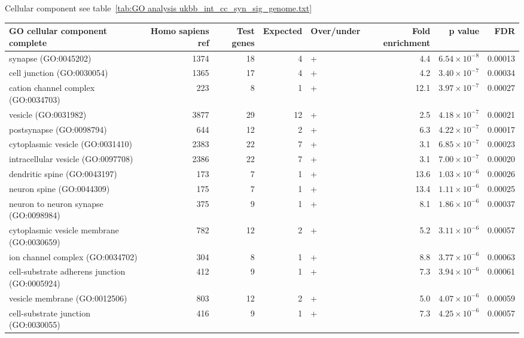 Cellular component see table~\ref{tab:GO analysis ukbb_int_cc_syn_sig_genome.txt}
\begin{table}[ht]
\centering
\begin{adjustbox}{width=\textwidth}
\begin{tabular}{lrrrlrrr}
  \hline
GO cellular component complete & Homo sapiens ref & Test genes & Expected & Over/under & Fold enrichment & p value & FDR \\ 
  \hline
synapse (GO:0045202) & 1374 & 18 & 4 & + & 4.4 & $6.54 \times 10^{-8}$ & 0.00013 \\ 
  cell junction (GO:0030054) & 1365 & 17 & 4 & + & 4.2 & $3.40 \times 10^{-7}$ & 0.00034 \\ 
  cation channel complex (GO:0034703) & 223 & 8 & 1 & + & 12.1 & $3.97 \times 10^{-7}$ & 0.00027 \\ 
  vesicle (GO:0031982) & 3877 & 29 & 12 & + & 2.5 & $4.18 \times 10^{-7}$ & 0.00021 \\ 
  postsynapse (GO:0098794) & 644 & 12 & 2 & + & 6.3 & $4.22 \times 10^{-7}$ & 0.00017 \\ 
  cytoplasmic vesicle (GO:0031410) & 2383 & 22 & 7 & + & 3.1 & $6.85 \times 10^{-7}$ & 0.00023 \\ 
  intracellular vesicle (GO:0097708) & 2386 & 22 & 7 & + & 3.1 & $7.00 \times 10^{-7}$ & 0.00020 \\ 
  dendritic spine (GO:0043197) & 173 & 7 & 1 & + & 13.6 & $1.03 \times 10^{-6}$ & 0.00026 \\ 
  neuron spine (GO:0044309) & 175 & 7 & 1 & + & 13.4 & $1.11 \times 10^{-6}$ & 0.00025 \\ 
  neuron to neuron synapse (GO:0098984) & 375 & 9 & 1 & + & 8.1 & $1.86 \times 10^{-6}$ & 0.00037 \\ 
  cytoplasmic vesicle membrane (GO:0030659) & 782 & 12 & 2 & + & 5.2 & $3.11 \times 10^{-6}$ & 0.00057 \\ 
  ion channel complex (GO:0034702) & 304 & 8 & 1 & + & 8.8 & $3.77 \times 10^{-6}$ & 0.00063 \\ 
  cell-substrate adherens junction (GO:0005924) & 412 & 9 & 1 & + & 7.3 & $3.94 \times 10^{-6}$ & 0.00061 \\ 
  vesicle membrane (GO:0012506) & 803 & 12 & 2 & + & 5.0 & $4.07 \times 10^{-6}$ & 0.00059 \\ 
  cell-substrate junction (GO:0030055) & 416 & 9 & 1 & + & 7.3 & $4.25 \times 10^{-6}$ & 0.00057 \\ 

\end{tabular}
\end{adjustbox}
\end{table}
